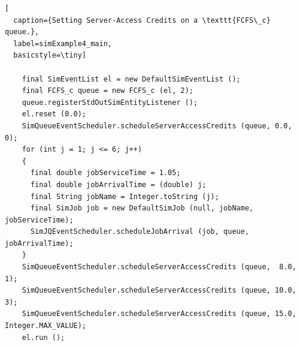 \begin{lstfloat}
\begin{lstlisting}[
  caption={Setting Server-Access Credits on a \texttt{FCFS\_c} queue.},
  label=simExample4_main,
  basicstyle=\tiny]

    final SimEventList el = new DefaultSimEventList ();
    final FCFS_c queue = new FCFS_c (el, 2);
    queue.registerStdOutSimEntityListener ();
    el.reset (0.0);
    SimQueueEventScheduler.scheduleServerAccessCredits (queue, 0.0, 0);
    for (int j = 1; j <= 6; j++)
    {
      final double jobServiceTime = 1.05;
      final double jobArrivalTime = (double) j;
      final String jobName = Integer.toString (j);
      final SimJob job = new DefaultSimJob (null, jobName, jobServiceTime);
      SimJQEventScheduler.scheduleJobArrival (job, queue, jobArrivalTime);
    }
    SimQueueEventScheduler.scheduleServerAccessCredits (queue,  8.0, 1);
    SimQueueEventScheduler.scheduleServerAccessCredits (queue, 10.0, 3);
    SimQueueEventScheduler.scheduleServerAccessCredits (queue, 15.0, Integer.MAX_VALUE);
    el.run ();

\end{lstlisting}
\end{lstfloat}
  
